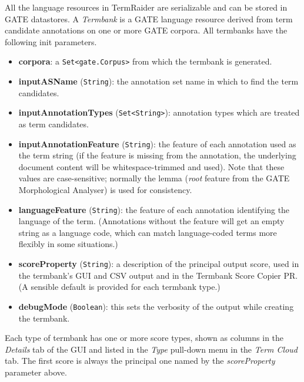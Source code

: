 All the language resources in TermRaider are serializable and can be stored in
GATE datastores.
A \emph{Termbank} is a GATE language resource derived from term candidate
annotations on one or more GATE corpora.  All termbanks have the following init
parameters.
\begin{itemize}
\item \textbf{corpora}: a \texttt{Set<gate.Corpus>} from which the termbank is
  generated.
\item \textbf{inputASName} (\texttt{String}): the annotation set name in which
  to find the term candidates.
\item \textbf{inputAnnotationTypes} (\texttt{Set<String>}): annotation types
  which are treated as term candidates.
\item \textbf{inputAnnotationFeature} (\texttt{String}): the feature of each
  annotation used as the term string (if the feature is missing from the
  annotation, the underlying document content will be whitespace-trimmed and
  used).  Note that these values are case-sensitive; normally the lemma
  (\emph{root} feature from the GATE Morphological Analyser) is used for
  consistency.
\item \textbf{languageFeature} (\texttt{String}): the feature of each annotation
  identifying the language of the term.  (Annotations without the feature will
  get an empty string as a language code, which can match language-coded terms
  more flexibly in some situations.)
\item \textbf{scoreProperty} (\texttt{String}): a description of the principal
  output score, used in the termbank's GUI and CSV output and in the Termbank
  Score Copier PR.  (A sensible default is provided for each termbank type.)
\item \textbf{debugMode} (\texttt{Boolean}): this sets the verbosity of the
  output while creating the termbank.
\end{itemize}


Each type of termbank has one or more score types, shown as columns in the
\emph{Details} tab of the GUI and listed in the \emph{Type} pull-down menu in
the \emph{Term Cloud} tab.  The first score is always the principal one named by
the \emph{scoreProperty} parameter above.


